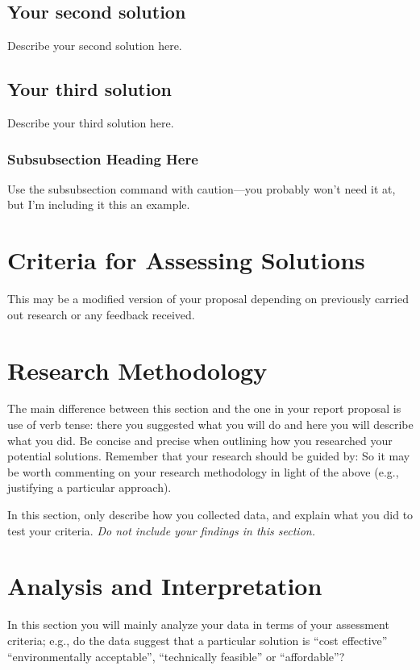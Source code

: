 \documentclass[peerreview]{IEEEtran}
\begin{document}
\subsection{Your second solution}
Describe your second solution here.
\subsection{Your third solution}
Describe your third solution here.
\subsubsection{Subsubsection Heading Here}
Use the subsubsection command with caution---you probably won't need it at, but I'm including it this an example.

\section{Criteria for Assessing Solutions} \label{sec:criteria}
This may be a modified version of your proposal depending on previously carried out research or any feedback received.  



\section{Research Methodology}
The main difference between this section and the one in your report proposal is use of verb tense: there you suggested what you will do and here you will describe what you did. Be concise and precise when outlining how you researched your potential solutions. 
Remember that your research should be guided by: 
So it may be worth commenting on your research methodology in light of the above (e.g., justifying a particular approach).  

In this section, only describe how you collected data, and explain what you did to test your criteria.  \emph{Do not include your findings in this section.}

\section{Analysis and Interpretation}
 In this section you will mainly analyze your data in terms of your assessment criteria; e.g., do the data suggest that a particular solution is ``cost effective'' ``environmentally acceptable'', ``technically feasible'' or ``affordable''?
   
\end{document}
